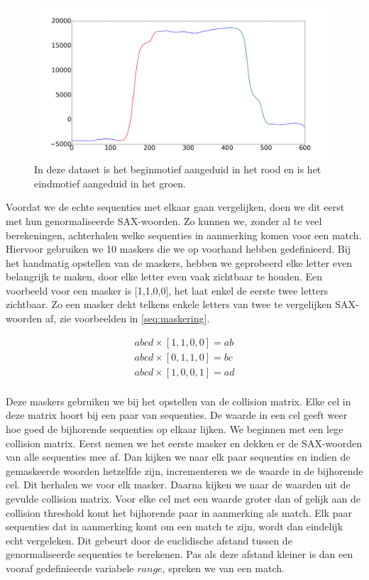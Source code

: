 \documentclass{article}
\begin{document}
\begin{figure}[h]
\centering
\includegraphics[width=\linewidth]{images/motif_begin_end}
\caption{In deze dataset is het beginmotief aangeduid in het rood en is het eindmotief aangeduid in het groen.}
\label{fig:beginend}
\end{figure}

Voordat we de echte sequenties met elkaar gaan vergelijken, doen we dit eerst met hun genormaliseerde SAX-woorden. Zo kunnen we, zonder al te veel berekeningen, achterhalen welke sequenties in aanmerking komen voor een match. Hiervoor gebruiken we 10 maskers die we op voorhand hebben gedefinieerd. Bij het handmatig opstellen van de maskers, hebben we geprobeerd elke letter even belangrijk te maken, door elke letter even vaak zichtbaar te houden. Een voorbeeld voor een masker is [1,1,0,0], het laat enkel de eerste twee letters zichtbaar.  Zo een masker dekt telkens enkele letters van twee te vergelijken SAX-woorden af, zie voorbeelden in \ref{seq:maskering}. 

\begin{equation}
\label{seq:maskering}
\begin{aligned}
abcd \times [1,1,0,0] = ab \\
abcd \times [0,1,1,0] = bc \\
abcd \times [1,0,0,1] = ad \\
\end{aligned} 
\end{equation}

Deze maskers gebruiken we bij het opstellen van de collision matrix. Elke cel in deze matrix hoort bij een paar van sequenties. De waarde in een cel geeft weer hoe goed de bijhorende sequenties op elkaar lijken. We beginnen met een lege collision matrix. Eerst nemen we het eerste masker en dekken er de SAX-woorden van alle sequenties mee af. Dan kijken we naar elk paar sequenties en indien de gemaskeerde woorden hetzelfde zijn, incrementeren we de waarde in de bijhorende cel. Dit herhalen we voor elk masker. Daarna kijken we naar de waarden uit de gevulde collision matrix. Voor elke cel met een waarde groter dan of gelijk aan de collision threshold komt het bijhorende paar in aanmerking als match. Elk paar sequenties dat in aanmerking komt om een match te zijn, wordt dan eindelijk echt vergeleken. Dit gebeurt door de euclidische afstand tussen de genormaliseerde sequenties te berekenen. Pas als deze afstand kleiner is dan een vooraf gedefinieerde variabele $range$, spreken we van een match.
\end{document}
